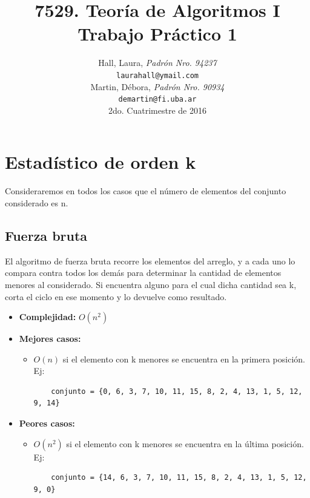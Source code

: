 \documentclass[a4paper,10pt]{article}
\title{ \textbf{ 7529. Teoría de Algoritmos I\\
Trabajo Práctico 1}}
\author{ Hall, Laura, \textit{Padrón Nro. 94237} \\
\texttt{ laurahall@ymail.com } \\[2.5ex]
Martin, Débora, \textit{Padrón Nro. 90934} \\
\texttt{ demartin@fi.uba.ar } \\[2.5ex]
\normalsize{2do. Cuatrimestre de 2016} \\
}
\date{}
\begin{document}
\maketitle
\thispagestyle{empty} %
\setcounter{page}{0}
\newpage
\tableofcontents

\newpage

\section{Estadístico de orden k}

Consideraremos en todos los casos que el número de elementos del conjunto considerado es n.

\subsection{Fuerza bruta}

El algoritmo de fuerza bruta recorre los elementos del arreglo, y a cada uno lo compara contra todos los demás para determinar la cantidad de elementos menores al considerado. Si encuentra alguno para el cual dicha cantidad sea k, corta el ciclo en ese momento y lo devuelve como resultado. 

\begin{itemize}

\item \textbf{Complejidad:} $O(n^2)$
\item \textbf{Mejores casos:}
	\begin{itemize}
	\item $O(n)$ si el elemento con k menores se encuentra en la primera posición. Ej:
	\begin{verbatim}
	conjunto = {0, 6, 3, 7, 10, 11, 15, 8, 2, 4, 13, 1, 5, 12, 9, 14}
	\end{verbatim}
	\end{itemize}

\item \textbf{Peores casos:}
	\begin{itemize}
	\item $O(n^2)$ si el elemento con k menores se encuentra en la última posición. Ej:
	\begin{verbatim}
	conjunto = {14, 6, 3, 7, 10, 11, 15, 8, 2, 4, 13, 1, 5, 12, 9, 0}
	\end{verbatim}
	\end{itemize}

\end{itemize}
	
\end{document}
